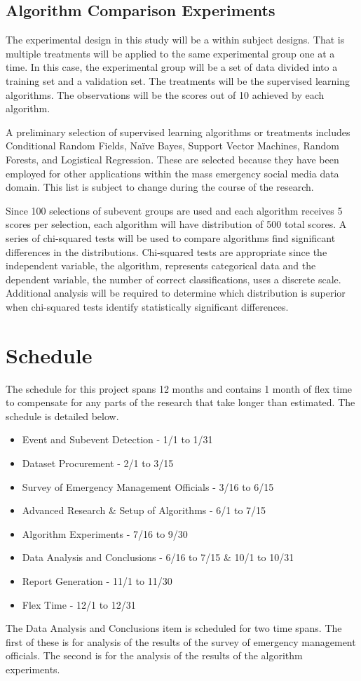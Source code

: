 \documentclass[conference]{IEEEtran}
\begin{document}
\subsection{Algorithm Comparison Experiments}
The experimental design in this study will be a within subject designs. That is multiple treatments will be applied to the same experimental group one at a time. In this case, the experimental group will be a set of data divided into a training set and a validation set. The treatments will be the supervised learning algorithms. The observations will be the scores out of 10 achieved by each algorithm.

A preliminary selection of supervised learning algorithms or treatments includes Conditional Random Fields, Na\"{i}ve Bayes, Support Vector Machines, Random Forests, and Logistical Regression. These are selected because they have been employed for other applications within the mass emergency social media data domain. This list is subject to change during the course of the research.

Since 100 selections of subevent groups are used and each algorithm receives 5 scores per selection, each algorithm will have distribution of 500 total scores. A series of chi-squared tests will be used to compare algorithms find significant differences in the distributions. Chi-squared tests are appropriate since the independent variable, the algorithm, represents categorical data and the dependent variable, the number of correct classifications, uses a discrete scale. Additional analysis will be required to determine which distribution is superior when chi-squared tests identify statistically significant differences.

\section{Schedule}
The schedule for this project spans 12 months and contains 1 month of flex time to compensate for any parts of the research that take longer than estimated. The schedule is detailed below.
\begin{itemize}
	\item Event and Subevent Detection - 1/1 to 1/31  
	\item Dataset Procurement - 2/1 to 3/15  
	\item Survey of Emergency Management Officials - 3/16 to 6/15  
	\item Advanced Research \& Setup of Algorithms - 6/1 to 7/15 
	\item Algorithm Experiments - 7/16 to 9/30 
	\item Data Analysis and Conclusions - 6/16 to 7/15 \& 10/1 to 10/31 
	\item Report Generation - 11/1 to 11/30 
	\item Flex Time - 12/1 to 12/31 
\end{itemize}
The Data Analysis and Conclusions item is scheduled for two time spans. The first of these is for analysis of the results of the survey of emergency management officials. The second is for the analysis of the results of the algorithm experiments.	
\end{document}
